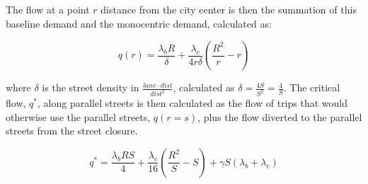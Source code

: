 \documentclass{article}
\begin{document}
The flow at a point $r$ distance from the city center is then the summation of this baseline demand and the monocentric demand, calculated as:

\begin{equation}
    q(r) = \frac{\lambda_b R}{\delta} + \frac{\lambda_c}{4r\delta} \left( \frac{R^2}{r} - r \right)
\end{equation}

\noindent where $\delta$ is the street density in $\frac{lane \cdot dist}{dist^2}$, calculated as $\delta = \frac{4S}{S^2} = \frac{4}{S}$. The critical flow, $q^*$, along parallel streets is then calculated as the flow of trips that would otherwise use the parallel streets, $q(r=s)$, plus the flow diverted to the parallel streets from the street closure.

\begin{equation}
    q^* = \frac{\lambda_b R S}{4} + \frac{\lambda_c}{16} \left( \frac{R^2}{S} - S \right) + \gamma S (\lambda_b + \lambda_c)
\end{equation}
\end{document}

